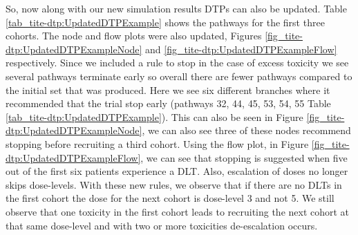 So, now along with our new simulation results DTPs can also be updated. Table \ref{tab_tite-dtp:UpdatedDTPExample} shows the pathways for the first three cohorts. The node and flow plots were also updated, Figures \ref{fig_tite-dtp:UpdatedDTPExampleNode} and \ref{fig_tite-dtp:UpdatedDTPExampleFlow} respectively. Since we included a rule to stop in the case of excess toxicity we see several pathways terminate early so overall there are fewer pathways compared to the initial set that was produced. Here we see six different branches where it recommended that the trial stop early (pathways 32, 44, 45, 53, 54, 55 Table \ref{tab_tite-dtp:UpdatedDTPExample}). This can also be seen in Figure \ref{fig_tite-dtp:UpdatedDTPExampleNode}, we can also see three of these nodes recommend stopping before recruiting a third cohort. Using the flow plot, in Figure \ref{fig_tite-dtp:UpdatedDTPExampleFlow}, we can see that stopping is suggested when five out of the first six patients experience a DLT. Also, escalation of doses no longer skips dose-levels. With these new rules, we observe that if there are no DLTs in the first cohort the dose for the next cohort is dose-level 3 and not 5. We still observe that one toxicity in the first cohort leads to recruiting the next cohort at that same dose-level and with two or more toxicities de-escalation occurs. 

